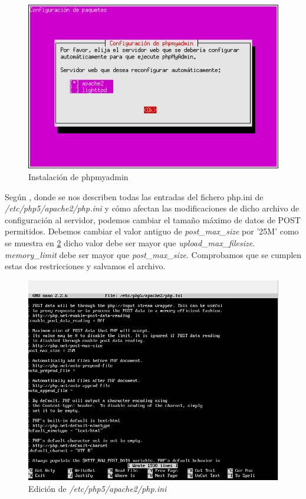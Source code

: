 \begin{figure}[H]
	\centering
	\includegraphics[scale=0.6]{installphpmyadmin.png}
	\caption{Instalación de phpmyadmin} \label{installphpmyadmin}
\end{figure}

Según \cite{php}, donde se nos describen todas las entradas del fichero php.ini de \textit{/etc/php5/apache2/php.ini} y cómo afectan las modificaciones de dicho archivo de configuración al servidor, podemos cambiar el tamaño máximo de datos de POST permitidos. Debemos cambiar el valor antiguo de \textit{post\_max\_size} por '25M' como se muestra en \ref{editphpini} dicho valor debe ser mayor que \textit{ upload\_max\_filesize}. \textit{memory\_limit} debe ser mayor que \textit{post\_max\_size}. Comprobamos que se cumplen estas dos restricciones y salvamos el archivo.

\begin{figure}[H]
	\centering
	\includegraphics[scale=0.6]{editphpini.png}
	\caption{Edición de \textit{/etc/php5/apache2/php.ini}} \label{editphpini}
\end{figure}


